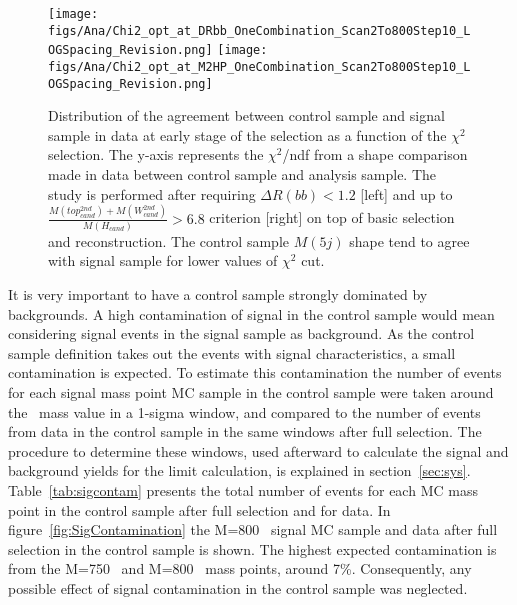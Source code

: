 \begin{figure}[!Hhtbp]
  \begin{center}
    \texttt{[image: figs/Ana/Chi2\_opt\_at\_DRbb\_OneCombination\_Scan2To800Step10\_LOGSpacing\_Revision.png]} %
    \texttt{[image: figs/Ana/Chi2\_opt\_at\_M2HP\_OneCombination\_Scan2To800Step10\_LOGSpacing\_Revision.png]}
    \caption{Distribution of the agreement between control sample and signal sample in data at early stage of the selection as a function of the $\chi^2$ selection. The y-axis represents the $\chi^{2}$/ndf from a shape comparison made in data between control sample and analysis sample. The study is performed after requiring $\Delta R(bb) <1.2$ [left] and up to $\frac{M(top^{2nd}_{cand})+M(W^{2nd}_{cand})}{M(H_{cand})}>6.8$ criterion [right] on top of basic selection and reconstruction. The control sample $M(5j)$ shape tend to agree with signal sample for lower values of $\chi^2$ cut.}
    \label{fig:optchi2}
  \end{center}
\end{figure}

It is very important to have a control sample strongly dominated by backgrounds. A high contamination of signal in the control sample would mean considering signal events in the signal sample as background. As the control sample definition takes out the events with signal characteristics, a small contamination is expected. To estimate this contamination the number of events for each signal mass point MC sample in the control sample were taken around the \Tp~mass value in a 1-sigma window, and compared to the number of events from data in the control sample in the same windows after full selection. The procedure to determine these windows, used afterward to calculate the signal and background yields for the limit calculation, is explained in section~\ref{sec:sys}. Table~\ref{tab:sigcontam} presents the total number of events for each MC mass point in the control sample after full selection and for data. In figure~\ref{fig:SigContamination} the M=800 \GeVcc~signal MC sample and data after full selection in the control sample is shown. The highest expected contamination is from the M=750 \GeVcc~and M=800 \GeVcc~mass points, around 7\%. Consequently, any possible effect of signal contamination in the control sample was neglected. 

